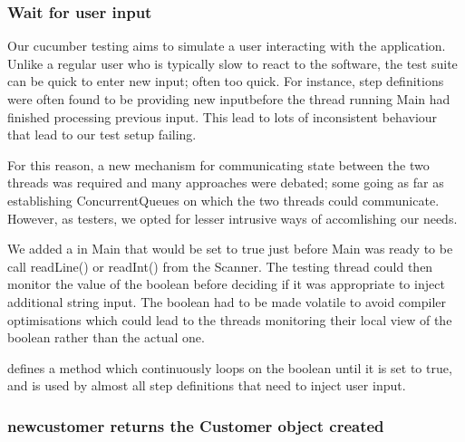 \subsubsection{Wait for user input}
Our cucumber testing aims to simulate a user interacting with the application.  Unlike a regular user who is typically slow to react to the software, the test suite can be quick to enter new input; often too quick. 
For instance, step definitions were often found to be providing new inputbefore the thread running Main had finished processing previous input. This lead to lots of inconsistent behaviour that lead to our test setup failing. 
\par 
For this reason, a new mechanism for communicating state between the two threads was required and many approaches were debated; some going as far as establishing ConcurrentQueues on which the two threads could communicate.
However, as testers, we opted for lesser intrusive ways of accomlishing our needs. 
\par 
We added a  in Main that would be set to true just before Main was ready to be call readLine() or readInt() from the Scanner. The testing thread could then monitor the value of the boolean before deciding if it was appropriate to inject additional string input. The boolean had to be made volatile to avoid compiler optimisations which could lead to the threads monitoring their local view of the boolean rather than the actual one. 
\par 
{} defines a method  which continuously loops on the boolean until it is set to true, and is used by almost all step definitions that need to inject user input. 


\subsubsection{newcustomer returns the Customer object created}


